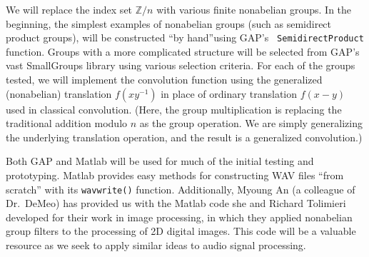 \documentclass[10pt]{article}
\begin{document}
\vskip5mm

We will replace the index set $\mathbb{Z}/n$ with various finite nonabelian
groups.  In the beginning, the simplest examples of nonabelian groups (such as
semidirect product groups), will be constructed ``by hand''using GAP's {\tt
  SemidirectProduct} function.  Groups with a more complicated structure will be
selected from GAP's vast SmallGroups library using various selection criteria.
For each of the groups tested, we will implement the
convolution function using the generalized (nonabelian) translation $f(xy^{-1})$
in place of ordinary translation $f(x-y)$ used in classical convolution. (Here,
the group multiplication is replacing the traditional addition modulo $n$ as the
group operation.  We are simply generalizing the underlying translation
operation, and the result is a generalized convolution.)

Both GAP and Matlab will be used for much of the initial testing and
prototyping. Matlab provides easy methods for constructing WAV files ``from
scratch'' with its {\tt wavwrite()} function. Additionally, Myoung An (a colleague of
Dr.~DeMeo) has provided us with the Matlab code she and Richard Tolimieri developed for
their work in image processing, in which they applied nonabelian group
filters to the processing of 2D digital images. This code will be a valuable
resource as we seek to apply similar ideas to audio signal processing.  
\end{document}
